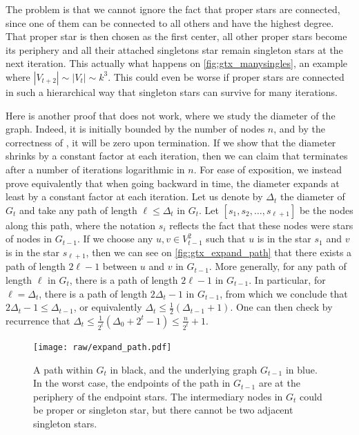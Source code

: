 The problem is that we cannot ignore the fact that proper stars are connected, since one of them can
be connected to all others and have the highest degree. That proper star is then chosen as the first
center, all other proper stars become its periphery and all their attached singletons star remain
singleton stars at the next iteration. This actually what happens on \autoref{fig:gtx_manysingles},
an example where $|V_{t+2}| \sim |V_t| \sim k^3$. This could even be worse if proper stars are
connected in such a hierarchical way that singleton stars can survive for many iterations.


Here is another proof that does not work, where we study the diameter of the graph. Indeed, it is
initially bounded by the number of nodes $n$, and by the correctness of \gtx{}, it will be zero upon
termination. If we show that the diameter shrinks by a constant factor at each iteration, then we
can claim that \gtx{} terminates after a number of iterations logarithmic in $n$. For ease of
exposition, we instead prove equivalently that when going backward in time, the diameter expands at
least by a constant factor at each iteration. Let us denote by $\Delta_t$ the diameter of $G_t$ and
take any path of length $\ell \leq \Delta_t$ in $G_t$. Let $[s_1, s_2, \ldots, s_{\ell+1}]$ be the
nodes along this path, where the notation $s_i$ reflects the fact that these nodes were stars of
nodes in $G_{t-1}$. If we choose any $u,v \in V_{t-1}^2$ such that $u$ is in the star $s_1$ and $v$
is in the star $s_{\ell+1}$, then we can see on \autoref{fig:gtx_expand_path} that there exists a
path of length $2\ell -1$ between $u$ and $v$ in $G_{t-1}$.
{\color{blue}{\large The figure actually shows this is not always true.}
More generally, for any path of length
$\ell$ in $G_t$, there is a path of length $2\ell-1$ in $G_{t-1}$. In particular, for
$\ell=\Delta_t$, there is a path of length $2\Delta_t-1$ in $G_{t-1}$, from which we conclude that
$2\Delta_t-1\leq\Delta_{t-1}$, or equivalently $\Delta_t \leq
\frac{1}{2}\left(\Delta_{t-1}+1\right)$. One can then check by recurrence that $\Delta_t \leq
\frac{1}{2^t} \left(\Delta_0+2^t-1\right) \leq \frac{n}{2^t} + 1$.}

\begin{figure}[htpb]
   \centering
   \texttt{[image: raw/expand\_path.pdf]}
   \caption[Star expansion of a path]{A path within $G_t$ in black, and the underlying graph
     $G_{t-1}$ in blue. In the worst case, the endpoints of the path in $G_{t-1}$ are at the
     periphery of the endpoint stars.  The intermediary nodes in $G_t$ could be proper or singleton
     star, but there cannot be two adjacent singleton stars.}
   \label{fig:gtx_expand_path}
\end{figure}
\fi

